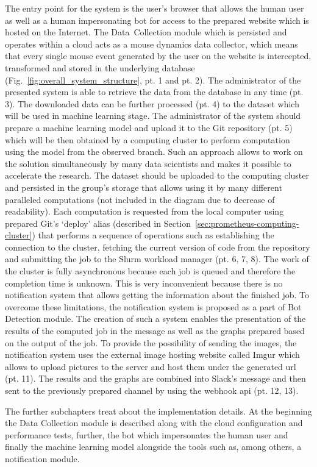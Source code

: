 The entry point for the system is the user's browser that allows the human user as well as a human impersonating bot for access to the prepared website which is hosted on the Internet.
The \mbox{Data Collection} module which is persisted and operates within a cloud acts as a mouse dynamics data collector, which means that every single mouse event generated by the user on the website is intercepted, transformed and stored in the underlying database (Fig.~\ref{fig:overall_system_structure}, pt. 1 and pt. 2).
The administrator of the presented system is able to retrieve the data from the database in any time (pt. 3).
The downloaded data can be further processed (pt. 4) to the dataset which will be used in machine learning stage.
The administrator of the system should prepare a machine learning model and upload it to the Git repository (pt. 5) which will be then obtained by a computing cluster to perform computation using the model from the observed branch.
Such an approach allows to work on the solution simultaneously by many data scientists and makes it possible to accelerate the research.
The dataset should be uploaded to the computing cluster and persisted in the group's storage that allows using it by many different paralleled computations (not included in the diagram due to decrease of readability).
Each computation is requested from the local computer using prepared Git's `deploy' alias (described in Section~\ref{sec:prometheus-computing-cluster}) that performs a sequence of operations such as establishing the connection to the cluster, fetching the current version of code from the repository and submitting the job to the Slurm workload manager (pt. 6, 7, 8).
The work of the cluster is fully asynchronous because each job is queued and therefore the completion time is unknown.
This is very inconvenient because there is no notification system that allows getting the information about the finished job.
To overcome these limitations, the notification system is proposed as a part of Bot Detection module.
The creation of such a system enables the presentation of the results of the computed job in the message as well as the graphs prepared based on the output of the job.
To provide the possibility of sending the images, the notification system uses the external image hosting website called Imgur which allows to upload pictures to the server and host them under the generated \gls{url} (pt. 11).
The results and the graphs are combined into Slack's message and then sent to the previously prepared channel by using the webhook \gls{api} (pt. 12, 13).

The further subchapters treat about the implementation details.
At the beginning the Data Collection module is described along with the cloud configuration and performance tests, further, the bot which impersonates the human user and finally the machine learning model alongside the tools such as, among others, a notification module.

